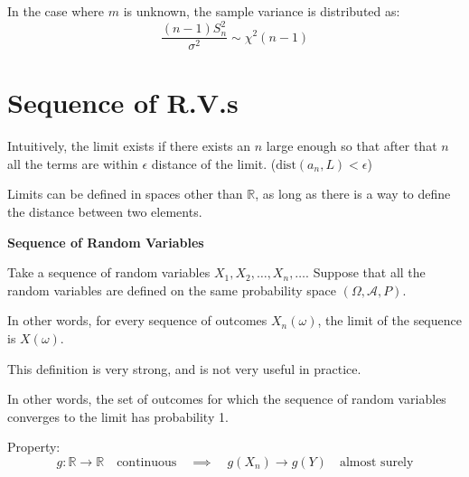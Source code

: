 In the case where $m$ is unknown, the sample variance is distributed as:
\[
\frac{(n-1) S_n^2}{\sigma^2} \sim \chi^2(n-1)
\]

\section{Sequence of R.V.s}


Intuitively, the limit exists if there exists an $n$ large enough so that after that $n$ all the terms are within $\epsilon$ distance of the limit. ($\text{dist}(a_n, L) < \epsilon$)

Limits can be defined in spaces other than $\mathbb{R}$, as long as there is a way to define the distance between two elements.

\textbf{Sequence of Random Variables}

Take a sequence of random variables $X_1, X_2, \ldots , X_n, \ldots$.
Suppose that all the random variables are defined on the same probability space $(\Omega, \mathcal{A}, P)$.


In other words, for every sequence of outcomes $X_n(\omega)$, the limit of the sequence is $X(\omega)$.

This definition is very strong, and is not very useful in practice.


In other words, the set of outcomes for which the sequence of random variables converges to the limit has probability 1.

Property:
\[
g: \mathbb{R} \to \mathbb{R} \quad \text{continuous} \quad \implies \quad g(X_n) \to g(Y) \quad \text{almost surely}
\]


